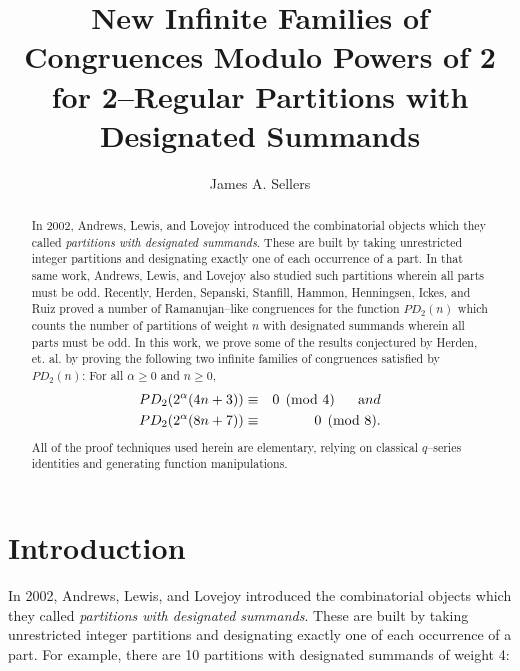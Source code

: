 \documentclass{amsart}
\begin{document}
	
\title[New Congruences for 2--Regular Partitions with Designated Summands]{New Infinite Families of Congruences Modulo Powers of 2 for 2--Regular Partitions with Designated Summands}
	

\author{James A. Sellers}
\address{Department of Mathematics and Statistics, University of Minnesota Duluth, Duluth, MN 55812, USA}

	
	
	
	
\maketitle
\begin{abstract}
In 2002, Andrews, Lewis, and Lovejoy introduced the combinatorial objects which they called {\it partitions with designated summands}.  These are built by taking unrestricted integer partitions and designating exactly one of each occurrence of a part.  In that same work, Andrews, Lewis, and Lovejoy also studied such partitions wherein all parts must be odd.  Recently, Herden, Sepanski, Stanfill, Hammon, Henningsen, Ickes, and Ruiz proved a number of Ramanujan--like congruences for the function $PD_2(n)$ which counts the number of partitions of weight $n$ with designated summands wherein all parts must be odd.  In this work, we prove some of the results conjectured by Herden, et. al. by proving the following two infinite families of congruences satisfied by $PD_2(n)$:  For all $\alpha\geq 0$ and $n\geq 0,$
\begin{eqnarray*}
PD_2(2^\alpha(4n+3)) &\equiv & 0 \pmod{4} \ \ \ \ \ {\textrm and} \\
PD_2(2^\alpha(8n+7)) &\equiv & 0 \pmod{8}.
\end{eqnarray*}
All of the proof techniques used herein are elementary, relying on classical $q$--series identities and generating function manipulations.  
\end{abstract}



\section{Introduction}  
In 2002, Andrews, Lewis, and Lovejoy \cite{ALL} introduced the combinatorial objects which they called {\it partitions with designated summands}.  These are built by taking unrestricted integer partitions and designating exactly one of each occurrence of a part.  For example, there are 10 partitions with designated summands of weight 4:  
\end{document}

